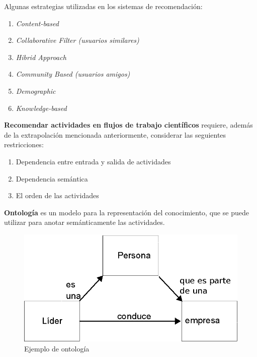\begin{frame}
	\begin{block}{}
		Algunas estrategias utilizadas en los sistemas de recomendación:
		
		\begin{enumerate}
			\item \emph{Content-based}
			\item \emph{Collaborative Filter (usuarios similares)}
			\item \emph{Hibrid Approach}
			\item \emph{Community Based (usuarios amigos)}
			\item \emph{Demographic}
			\item \emph{Knowledge-based}
		\end{enumerate}
	\end{block}
\end{frame}


\begin{frame}		
	\begin{block}{}
		\textbf{Recomendar actividades en flujos de trabajo científicos} requiere, además de la extrapolación mencionada anteriormente, considerar las seguientes restricciones:
		\begin{enumerate}
			\item Dependencia entre entrada y salida de actividades
			\item Dependencia semántica
			\item El orden de las actividades
		\end{enumerate}
	\end{block}
\end{frame}


\begin{frame}
	\begin{block}{}
		\textbf{Ontología} es un modelo para la representación del conocimiento, que se puede utilizar para anotar semánticamente las actividades.
		
		\begin{figure}
			\begin{minipage}[b]{0.7\textwidth}
				\includegraphics[width=\textwidth]{./secoes/ConceitosFundamentais/Ontologia.eps}
				\caption{Ejemplo de ontología}
			\end{minipage}
		\end{figure}
	\end{block}
\end{frame}

